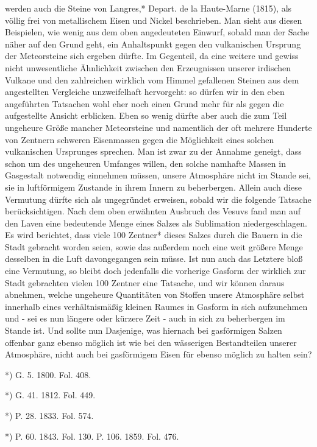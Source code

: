 \documentclass[a4paper, 8pt, oneside, polutonikogreek, german]{article}
\begin{document}
werden auch die Steine von Langres,* Depart. de la Haute-Marne (1815), als völlig frei von metallischem Eisen und Nickel beschrieben. Man sieht aus diesen Beispielen, wie wenig aus dem oben angedeuteten Einwurf, sobald man der Sache näher auf den Grund geht, ein Anhaltspunkt gegen den vulkanischen Ursprung der Meteorsteine sich ergeben dürfte. Im Gegenteil, da eine weitere und gewiss nicht unwesentliche Ähnlichkeit zwischen den Erzeugnissen unserer irdischen Vulkane und den zahlreichen wirklich vom Himmel gefallenen Steinen aus dem angestellten Vergleiche unzweifelhaft hervorgeht: so dürfen wir in den eben angeführten Tatsachen wohl eher noch einen Grund mehr für als gegen die aufgestellte Ansicht erblicken. Eben so wenig dürfte aber auch die zum Teil ungeheure Größe mancher Meteorsteine und namentlich der oft mehrere Hunderte von Zentnern schweren Eisenmassen gegen die Möglichkeit eines solchen vulkanischen Ursprunges sprechen. Man ist zwar zu der Annahme geneigt, dass schon um des ungeheuren Umfanges willen, den solche namhafte Massen in Gasgestalt notwendig einnehmen müssen, unsere Atmosphäre nicht im Stande sei, sie in luftförmigem Zustande in ihrem Innern zu beherbergen. Allein auch diese Vermutung dürfte sich als ungegründet erweisen, sobald wir die folgende Tatsache berücksichtigen. Nach dem oben erwähnten Ausbruch des Vesuvs fand man auf den Laven eine bedeutende Menge eines Salzes als Sublimation niedergeschlagen. Es wird berichtet, dass viele 100 Zentner* dieses Salzes durch die Bauern in die Stadt gebracht worden seien, sowie das außerdem noch eine weit größere Menge desselben in die Luft davongegangen sein müsse. Ist nun auch das Letztere bloß eine Vermutung, so bleibt doch jedenfalls die vorherige Gasform der wirklich zur Stadt gebrachten vielen 100 Zentner eine Tatsache, und wir können daraus abnehmen, welche ungeheure Quantitäten von Stoffen unsere Atmosphäre selbst innerhalb eines verhältnismäßig kleinen Raumes in Gasform in sich aufzunehmen und - sei es nun längere oder kürzere Zeit - auch in sich zu beherbergen im Stande ist. Und sollte nun Dasjenige, was hiernach bei gasförmigen Salzen offenbar ganz ebenso möglich ist wie bei den wässerigen Bestandteilen unserer Atmosphäre, nicht auch bei gasförmigem Eisen für ebenso möglich zu halten sein?

*) G. 5. 1800. Fol. 408.

*) G. 41. 1812. Fol. 449.

*) P. 28. 1833. Fol. 574.

*) P. 60. 1843. Fol. 130. P. 106. 1859. Fol. 476.
\end{document}
